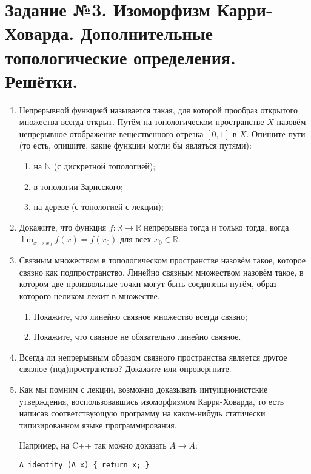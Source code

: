 \documentclass[10pt,a4paper,oneside]{article}
\begin{document}
\section*{Задание №3. Изоморфизм Карри-Ховарда. Дополнительные топологические определения. Решётки. }
\begin{enumerate}
\item Непрерывной функцией называется такая, для которой прообраз открытого множества всегда открыт.
Путём на топологическом пространстве $X$ назовём непрерывное отображение вещественного отрезка $[0,1]$ в $X$.
Опишите пути (то есть, опишите, какие функции могли бы являться путями):
\begin{enumerate}
\item на $\mathbb{N}$ (с дискретной топологией);
\item в топологии Зарисского;
\item на дереве (с топологией с лекции);
\end{enumerate}

\item Докажите, что функция $f: \mathbb{R}\rightarrow\mathbb{R}$ непрерывна тогда и только тогда, когда
$\lim_{x \rightarrow x_0} f(x) = f(x_0)$ для всех $x_0 \in \mathbb{R}$.

\item Связным множеством в топологическом пространстве назовём такое, которое связно как подпространство.
Линейно связным множеством назовём такое, в котором две произвольные точки могут быть соединены путём,
образ которого целиком лежит в множестве. 
\begin{enumerate}
\item Покажите, что линейно связное множество всегда связно;
\item Покажите, что связное не обязательно линейно связное.
\end{enumerate}

\item Всегда ли непрерывным образом связного пространства является другое связное (под)пространство? Докажите или опровергните.

\item Как мы помним с лекции, возможно доказывать интуиционистские утверждения, воспользовавшись изоморфизмом Карри-Ховарда, 
то есть написав соответствующую программу на каком-нибудь статически типизированном языке программирования. 

Например, на C++ так можно доказать $A\rightarrow A$:
\begin{verbatim}
A identity (A x) { return x; }
\end{verbatim}


\end{enumerate}
\end{document}
